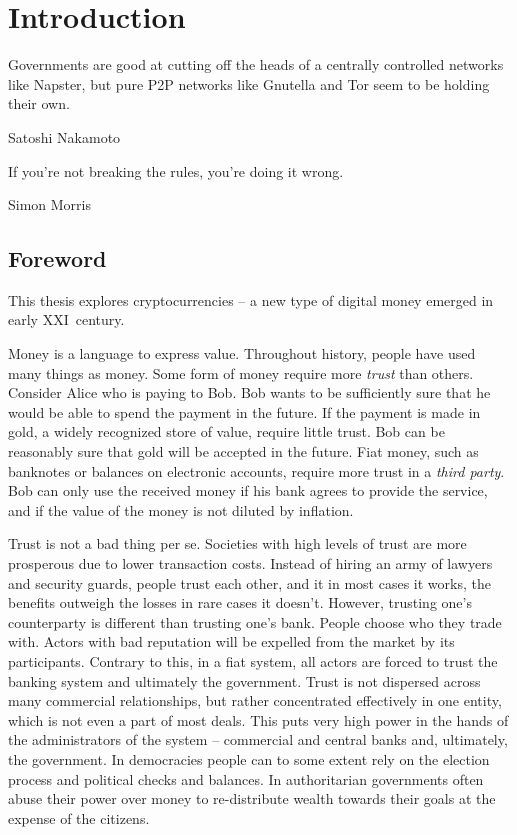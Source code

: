 \chapter{Introduction}

\label{Chapter01Introduction}

\epigraph{Governments are good at cutting off the heads of a centrally controlled networks like Napster, but pure P2P networks like Gnutella and Tor seem to be holding their own.}{Satoshi Nakamoto~\cite{Nakamoto2008}}
\epigraph{If you're not breaking the rules, you're doing it wrong.}{Simon Morris~\cite{Morris2018}}


\section{Foreword}

This thesis explores cryptocurrencies -- a new type of digital money emerged in early XXI~century.

Money is a language to express value.
Throughout history, people have used many things as money.
Some form of money require more \textit{trust} than others.
Consider Alice who is paying to Bob.
Bob wants to be sufficiently sure that he would be able to spend the payment in the future.
If the payment is made in gold, a widely recognized store of value, require little trust.
Bob can be reasonably sure that gold will be accepted in the future.
Fiat money, such as banknotes or balances on electronic accounts, require more trust in a \textit{third party}.
Bob can only use the received money if his bank agrees to provide the service, and if the value of the money is not diluted by inflation.

Trust is not a bad thing per se.
Societies with high levels of trust are more prosperous due to lower transaction costs.
Instead of hiring an army of lawyers and security guards, people trust each other, and it in most cases it works, the benefits outweigh the losses in rare cases it doesn't.
However, trusting one's counterparty is different than trusting one's bank.
People choose who they trade with.
Actors with bad reputation will be expelled from the market by its participants.
Contrary to this, in a fiat system, all actors are forced to trust the banking system and ultimately the government.
Trust is not dispersed across many commercial relationships, but rather concentrated effectively in one entity, which is not even a part of most deals.
This puts very high power in the hands of the administrators of the system -- commercial and central banks and, ultimately, the government.
In democracies people can to some extent rely on the election process and political checks and balances.
In authoritarian governments often abuse their power over money to re-distribute wealth towards their goals at the expense of the citizens.

